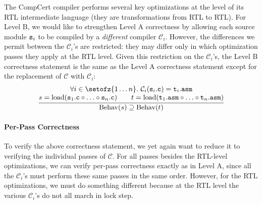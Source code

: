 The CompCert compiler performs several key optimizations at the level
of its RTL intermediate language (\ie they are transformations from
RTL to RTL).  For Level B, we would like to strengthen Level A
correctness by allowing each source module $\mathtt{s}_{i}$ to be compiled by
a \emph{different} compiler $\mathcal{C}_i$.  However, the differences
we permit between the $\mathcal{C}_i$'s are restricted: they may
differ only in which optimization passes they apply at the RTL level.
Given this restriction on the $\mathcal{C}_i$'s, the Level B
correctness statement is the same as the Level A correctness statement
except for the replacement of $\mathcal{C}$ with $\mathcal{C}_i$:
\[
\frac{
\begin{array}{@{}c@{}}
\forall i\in\setofz{1\ldots n}.~\mathcal{C}_i(\mathtt{s}_i\mathtt{.c}) = \mathtt{t}_i\mathtt{.asm} \\
s = \mathrm{load}(\mathtt{s}_1\mathtt{.c}\circ \ldots \circ \mathtt{s}_n\mathtt{.c})\qquad
t = \mathrm{load}(\mathtt{t}_1\mathtt{.asm}\circ \ldots \circ \mathtt{t}_n\mathtt{.asm})
\end{array}
}
{
\mathrm{Behav}(s) 
\supseteq \mathrm{Behav}(t)
}
\]

\paragraph{Per-Pass Correctness}

To verify the above correctness statement, we yet again want to reduce
it to verifying the individual passes of $\mathcal{C}$.  For all passes
besides the RTL-level optimizations, we can verify per-pass
correctness exactly as in Level A, since all the $\mathcal{C}_i$'s must
perform these same passes in the same order.  However, for the RTL
optimizations, we must do something different because at the RTL level
the various $\mathcal{C}_i$'s do not all march in lock step.

